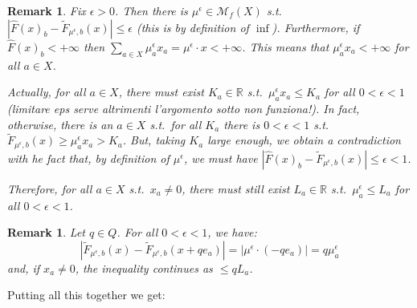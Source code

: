\documentclass[submission,copyright,creativecommons]{eptcs}
\newtheorem{Remark}[theorem]{Remark}
\newcommand{\R}{\mathbb{R}}
\newcommand{\fmsets}[1]{\mathcal{M}_f(#1)} %
\newcommand{\alarm}[1]{\color{red}#1\color{black}}
\begin{document}
\begin{Remark}
Fix $\epsilon>0$.
Then there is $\mu^\epsilon\in\fmsets{X}$ s.t.\ $|\hat{F}(x)_b-\widetilde{F}_{\mu^\epsilon,b}(x)|\leq\epsilon$ (this is by definition of $\inf$).
Furthermore, if $\hat F(x)_b < +\infty$ then $\sum\limits_{a\in X} \mu^\epsilon_a x_a=\mu^\epsilon\cdot x < +\infty$.
This means that $\mu^\epsilon_a x_a<+\infty$ for all $a\in X$.

Actually, for all $a\in X$, there must exist $K_a\in\R$ s.t.\ $\mu^\epsilon_a x_a \leq K_a$ for all $0<\epsilon<1$ \alarm{(limitare eps serve altrimenti l'argomento sotto non funziona!)}.
In fact, otherwise, there is an $a\in X$ s.t.\ for all $K_a$ there is $0<\epsilon<1$ s.t.\ $\widetilde{F}_{\mu^\epsilon,b}(x)\geq \mu^\epsilon_a x_a> K_a$.
But, taking $K_a$ large enough, we obtain a contradiction with he fact that, by definition of $\mu^\epsilon$, we must have $|\hat{F}(x)_b-\widetilde{F}_{\mu^\epsilon,b}(x)|\leq\epsilon<1$.

Therefore, for all $a\in X$ s.t.\ $x_a\neq 0$, there must still exist $L_a\in\R$ s.t.\ $\mu^\epsilon_a \leq L_a$ for all $0<\epsilon<1$.
\end{Remark}

\begin{Remark}
Let $q\in Q$. For all $0<\epsilon<1$, we have:
\[
 |\widetilde{F}_{\mu^\epsilon,b}(x)-\widetilde{F}_{\mu^\epsilon,b}(x+ qe_a)| =
 | \mu^\epsilon\cdot (-qe_a) |=
 q\mu^\epsilon_a\]
and, if $x_a\neq 0$, the inequality continues as $\leq qL_a$.
\end{Remark}

Putting all this together we get:
\end{document}
